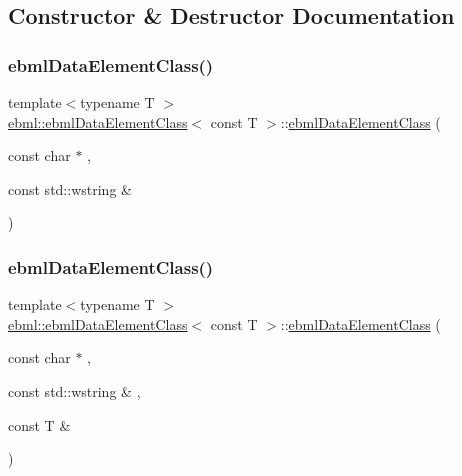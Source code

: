 \subsection{Constructor \& Destructor Documentation}
\mbox{\label{classebml_1_1ebmlDataElementClass_3_01const_01T_01_4_ad773b2b4c45bcb51ebfcba12d4888de2}} 
\subsubsection{\texorpdfstring{ebml\+Data\+Element\+Class()}{ebmlDataElementClass()}\hspace{0.1cm}{\footnotesize\ttfamily [1/6]}}
{\footnotesize\ttfamily template$<$typename T $>$ \\
\mbox{\hyperlink{classebml_1_1ebmlDataElementClass}{ebml\+::ebml\+Data\+Element\+Class}}$<$ const T $>$\+::\mbox{\hyperlink{classebml_1_1ebmlDataElementClass}{ebml\+Data\+Element\+Class}} (\begin{DoxyParamCaption}\item[{const char $\ast$}]{,  }\item[{const std\+::wstring \&}]{ }\end{DoxyParamCaption})}

\mbox{\label{classebml_1_1ebmlDataElementClass_3_01const_01T_01_4_a99c231404d053be2783f12671428baa5}} 
\subsubsection{\texorpdfstring{ebml\+Data\+Element\+Class()}{ebmlDataElementClass()}\hspace{0.1cm}{\footnotesize\ttfamily [2/6]}}
{\footnotesize\ttfamily template$<$typename T $>$ \\
\mbox{\hyperlink{classebml_1_1ebmlDataElementClass}{ebml\+::ebml\+Data\+Element\+Class}}$<$ const T $>$\+::\mbox{\hyperlink{classebml_1_1ebmlDataElementClass}{ebml\+Data\+Element\+Class}} (\begin{DoxyParamCaption}\item[{const char $\ast$}]{,  }\item[{const std\+::wstring \&}]{,  }\item[{const T \&}]{ }\end{DoxyParamCaption})}

